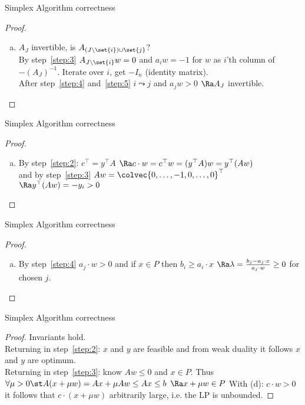 \documentclass[a4paper, x11names, svgnames]{beamer}
\theoremstyle{definition}
\theoremstyle{plain}
\theoremstyle{plain}
\begin{document}
\begin{frame}{Simplex Algorithm correctness}
    \begin{proof}
        \renewcommand{\theenumi}{(\alph{enumi})}
        \begin{enumerate}[(c)]
        \item $A_J$ invertible, is $A_{(J\setminus\set{i})\cup\set{j}}$? \\
            By step~\ref{step:3} $A_{J\setminus\set{i}} w = 0$ and $a_i w = -1$ for $w$ as $i$'th column of $-(A_J)^{-1}$.
            Iterate over $i$, get $-I_n$ (identity matrix). \\
            After step~\ref{step:4} and~\ref{step:5} $i \leadsto j$ and $a_j w > 0$ $\Ra A_J$ invertible. \\
        \end{enumerate}
    \end{proof}
\end{frame}

\begin{frame}{Simplex Algorithm correctness}
    \begin{proof}
        \renewcommand{\theenumi}{(\alph{enumi})}
        \begin{enumerate}[(d)]
        \item By step~\ref{step:2}: $c^\top=y^\top A$
            $\Ra c\cdot w = c^\top w = (y^\top A)w = y^\top (Aw)$ \\
            and by step~\ref{step:3} $A w = \colvec{0,\dots,-1,0,\dots,0}^\top$
            $\Ra y^\top (Aw) = -y_i > 0$ \pause  \\
    \end{enumerate}
    \end{proof}
\end{frame}

\begin{frame}{Simplex Algorithm correctness}
    \begin{proof}
        \renewcommand{\theenumi}{(\alph{enumi})}
        \begin{enumerate}[(e)]
            \item By step~\ref{step:4} $a_j\cdot w > 0$ and if $x\in P$ then $b_i \geq a_i\cdot x$
            $\Ra \lambda = \frac{b_j-a_j\cdot x}{a_j\cdot w} \geq 0$ for chosen $j$. \\
        \end{enumerate}
    \end{proof}
\end{frame}


\begin{frame}{Simplex Algorithm correctness}
    \begin{proof}
        Invariants hold. \\
        Returning in step~\ref{step:2}: $x$ and $y$ are feasible and from weak duality it follows $x$ and $y$ are optimum. \\
        Returning in step~\ref{step:3}: know $Aw \leq 0$ and $x \in P$. Thus $\forall\mu > 0\st A(x+\mu w) = Ax + \mu Aw \leq Ax \leq b$ $\Ra x+\mu w \in P$
        With (d): $c\cdot w > 0$ it follows that $c\cdot (x+\mu w)$ arbitrarily large, i.e. the LP is unbounded.
    \end{proof}
\end{frame}
\end{document}

